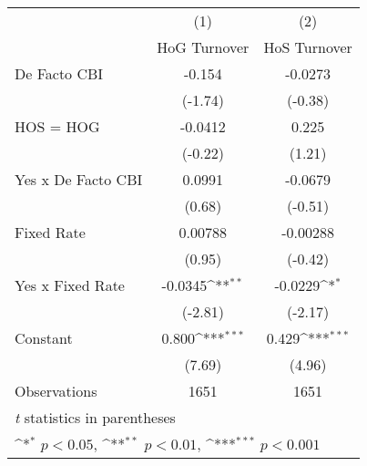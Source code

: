 \begin{table}[htbp]\centering
\def\sym#1{\ifmmode^{#1}\else\(^{#1}\)\fi}
\caption{\label{hoshogmultIndFEDF}}
\begin{tabular}{l*{2}{c}}
\toprule
                                        &\multicolumn{1}{c}{(1)}&\multicolumn{1}{c}{(2)}\\
                                        &\multicolumn{1}{c}{HoG Turnover}&\multicolumn{1}{c}{HoS Turnover}\\
\midrule
De Facto CBI                            &   -0.154         &  -0.0273         \\
                                        &  (-1.74)         &  (-0.38)         \\
\addlinespace
HOS = HOG                               &  -0.0412         &    0.225         \\
                                        &  (-0.22)         &   (1.21)         \\
\addlinespace
Yes x De Facto CBI                      &   0.0991         &  -0.0679         \\
                                        &   (0.68)         &  (-0.51)         \\
\addlinespace
Fixed Rate                              &  0.00788         & -0.00288         \\
                                        &   (0.95)         &  (-0.42)         \\
\addlinespace
Yes x Fixed Rate                        &  -0.0345\sym{**} &  -0.0229\sym{*}  \\
                                        &  (-2.81)         &  (-2.17)         \\
\addlinespace
Constant                                &    0.800\sym{***}&    0.429\sym{***}\\
                                        &   (7.69)         &   (4.96)         \\
\midrule
Observations                            &     1651         &     1651         \\
\bottomrule
\multicolumn{3}{l}{\footnotesize \textit{t} statistics in parentheses}\\
\multicolumn{3}{l}{\footnotesize \sym{*} \(p<0.05\), \sym{**} \(p<0.01\), \sym{***} \(p<0.001\)}\\
\end{tabular}
\end{table}
